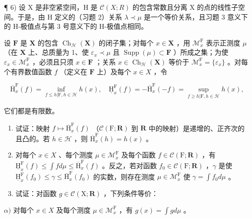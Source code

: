 ¶ 6) 设 X 是非空紧空间，H 是 \(\mathcal{C}(X;R)\) 的包含常数且分离 X 的点的线性子空间。于是，由 H 定义的（习题 2）关系 \(\lambda \prec \mu\) 是一个等价关系，且习题 3 意义下的 H-极值点与第 3 号意义下的 H-极值点相同。

设 \(\mathbf{F}\) 是 \(\mathbf{X}\) 的包含 \(\operatorname{Ch}_{\mathcal{H}}(\mathbf{X})\) 的闭子集；对每个 \(x \in \mathbf{X}\) ，用 \(\mathcal{M}_x^{\mathrm{F}}\) 表示正测度 \(\mu\) （在 \(\mathbf{X}\) 上、总质量为 1、使 \(\varepsilon_x \prec \mu\) 且 \(\operatorname{Supp}(\mu) \subset \mathbf{F}\) ）所成之集；为使 \(\varepsilon_x \in \mathcal{M}_x^{\mathrm{F}}\) ，必须且只须 \(x \in \mathbf{F}\) ；关系 \(x \in \operatorname{Ch}_{\mathcal{H}}(\mathbf{X})\) 等价于 \(\mathcal{M}_x^{\mathrm{F}} = \{\varepsilon_x\}\) 。对每个有界数值函数 \(f\) （定义在 \(\mathbf{F}\) 上）及每个 \(x \in X\) ，令

\[
\overline {{\mathrm{H}}} _ {x} ^ {\mathrm{F}} (f) = \inf _ {f \leqslant h | \mathrm{F}, h \in \mathscr {H}} h (x), \quad \underline {{\mathrm{H}}} _ {x} ^ {\mathrm{F}} (f) = - \overline {{\mathrm{H}}} _ {x} ^ {\mathrm{F}} (- f) = \sup _ {f \geqslant h | \mathrm{F}, h \in \mathscr {H}} h (x),
\]

它们都是有限数。

\begin{enumerate}
\def\labelenumi{\alph{enumi})}
\item
  试证：映射 \(f \mapsto \overline{\mathrm{H}}_x^{\mathrm{F}}(f)\) （\(\mathcal{C}(\mathrm{F};\mathbf{R})\) 到 \(\mathbf{R}\) 中的映射）是递增的、正齐次的且凸的。若 \(h \in \mathcal{H}\) ，则 \(\overline{\mathrm{H}}_x^{\mathrm{F}}(h) = h(x)\) 。
\item
  对每个 \(x \in X\) 、每个测度 \(\mu \in \mathcal{M}_x^{\mathrm{F}}\) 及每个函数 \(f \in \mathcal{C}(\mathrm{F};\mathbf{R})\) ，有 \(\underline{\mathrm{H}}_x^{\mathrm{F}}(f) \leqslant \int f d\mu \leqslant \overline{\mathrm{H}}_x^{\mathrm{F}}(f)\) 。反之，若对函数 \(f_0 \in \mathcal{C}(\mathrm{F};\mathbf{R})\) ，\(\gamma\) 是使 \(\underline{\mathrm{H}}_x^{\mathrm{F}}(f_0) \leqslant \gamma \leqslant \overline{\mathrm{H}}_x^{\mathrm{F}}(f_0)\) 的实数，则存在测度 \(\mu \in \mathcal{M}_x^{\mathrm{F}}\) 使 \(\gamma = \int f_0 d\mu\) 。
\item
  试证：对函数 \(g \in \mathcal{C}(\mathrm{X};\mathbf{R})\) ，下列条件等价：
\end{enumerate}

\(\alpha)\) 对每个 \(x \in X\) 及每个测度 \(\mu \in \mathcal{M}_x^{\mathrm{F}}\) ，有 \(g(x) = \int g d\mu\) 。

